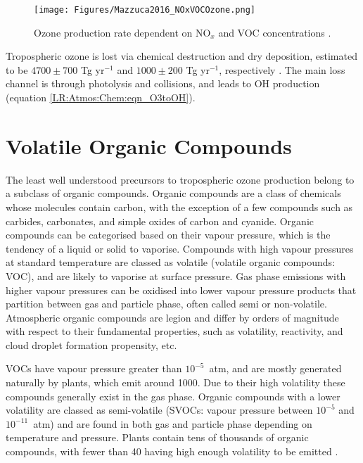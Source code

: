     \begin{figure}
      \texttt{[image: Figures/Mazzuca2016\_NOxVOCOzone.png]}
      \caption{Ozone production rate dependent on NO$_x$ and VOC concentrations \parencite{Mazzuca2016}.}
      \label{LR:VOCs:fig_NOXVOCOzone}
    \end{figure}
    
    Tropospheric ozone is lost via chemical destruction and dry deposition, estimated to be $4700\pm700$ Tg yr$^{-1}$ and $1000\pm200$ Tg yr$^{-1}$, respectively \parencite{Stevenson2006,Young2018}.
    The main loss channel is through photolysis and collisions, and leads to OH production (equation \ref{LR:Atmos:Chem:eqn_O3toOH}).
    
    

\section{Volatile Organic Compounds}
\label{LR:VOCs}

  The least well understood precursors to tropospheric ozone production belong to a subclass of organic compounds.
  Organic compounds are a class of chemicals whose molecules contain carbon, with the exception of a few compounds such as carbides, carbonates, and simple oxides of carbon and cyanide.
  Organic compounds can be categorised based on their vapour pressure, which is the tendency of a liquid or solid to vaporise.
  Compounds with high vapour pressures at standard temperature are classed as volatile (volatile organic compounds: VOC), and are likely to vaporise at surface pressure.
  Gas phase emissions with higher vapour pressures can be oxidised into lower vapour pressure products that partition between gas and particle phase, often called semi or non-volatile. 
  Atmospheric organic compounds are legion and differ by orders of magnitude with respect to their fundamental properties, such as volatility, reactivity, and cloud droplet formation propensity, etc.  
  
  
  VOCs have vapour pressure greater than $10^{-5}$~atm, and are mostly generated naturally by plants, which emit around 1000\tgpyr \parencite{Guenther1995, Glasius2016}.
  Due to their high volatility these compounds generally exist in the gas phase.
  Organic compounds with a lower volatility are classed as semi-volatile (SVOCs: vapour pressure between $10^{-5}$ and $10^{-11}$~atm) and are found in both gas and particle phase depending on temperature and pressure.
  Plants contain tens of thousands of organic compounds, with fewer than 40 having high enough volatility to be emitted \parencite{Guenther2000}.
  
